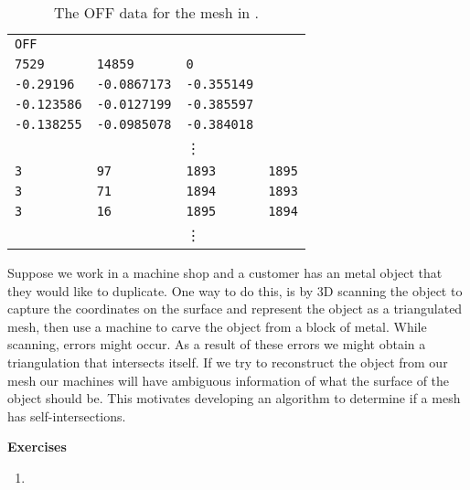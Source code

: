 \begin{table}[h!]
\caption{The OFF data for the mesh in .}
\centering
\begin{tabular}{|p{2cm} p{2cm} p{2cm} p{2cm}|} 
 \hline
\texttt{OFF} &  & &  \\ 
\texttt{7529} & \texttt{14859} & \texttt{0} &  \\ 
\texttt{-0.29196} & \texttt{-0.0867173} & \texttt{-0.355149}  &  \\
 \texttt{-0.123586}   & \texttt{-0.0127199} & \texttt{-0.385597} &  \\
\texttt{-0.138255}   & \texttt{-0.0985078} & \texttt{-0.384018} &  \\
  & &\vdots &  \\  
 \texttt{3}&  \texttt{97} &\texttt{1893}& \texttt{1895}\\
 \texttt{3}& \texttt{71} & \texttt{1894} & \texttt{1893} \\
 \texttt{3} & \texttt{16} & \texttt{1895} & \texttt{1894}\\
   & &\vdots &  \\  
 \hline
\end{tabular}

\label{tab:off}
\end{table}

Suppose we work in a machine shop and a customer has an metal object that they would like
to duplicate.
One way to do this, is by 3D scanning the object to capture the coordinates on the 
surface and represent the object as a triangulated mesh, then use a machine to carve the object
from a block of metal. 
While scanning, errors might occur. As a result of these errors
we might obtain a triangulation that intersects itself. If we try to reconstruct the object
from our mesh our machines will have ambiguous information of what the surface of the object
should be.
This motivates developing an algorithm to determine if a mesh has self-intersections.


\noindent \textbf{Exercises}


\begin{enumerate}
	\item 
	
\end{enumerate}

\pagebreak